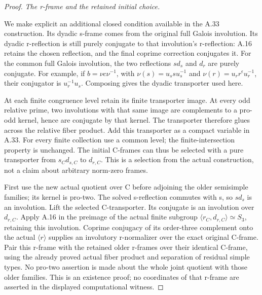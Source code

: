 \begin{proof}
\emph{The r-frame and the retained initial choice.}\par
We make explicit an additional closed condition available in
the A.33 construction. Its dyadic s-frame comes from the original
full Galois involution. Its dyadic r-reflection is still purely
conjugate to that involution's r-reflection: A.16 retains the
chosen reflection, and the final coprime correction conjugates it.
For the common full Galois involution, the two reflections
\(s d_s\) and \(d_r\) are purely conjugate. For example, if
\(b=\nu c\nu^{-1}\), with
\(\nu(s)=u_s s u_s^{-1}\) and
\(\nu(r)=u_r r^{\epsilon}u_r^{-1}\), their conjugator is
\(u_r^{-1}u_s\). Composing gives the dyadic transporter used here.

At each finite congruence level retain its finite transporter
image. At every odd relative prime, two involutions with that
same image are complements to a pro-odd kernel, hence are
conjugate by that kernel. The transporter therefore glues across
the relative fiber product. Add this transporter as a compact
variable in A.33. For every finite collection use a common level;
the finite-intersection property is unchanged. The initial
C-frames can thus be selected with a pure transporter from
\(s_Cd_{s,C}\) to \(d_{r,C}\). This is a selection from the
actual construction, not a claim about arbitrary norm-zero frames.

First use the new actual quotient over C before adjoining the
older semisimple families; its kernel is pro-two. The solved
s-reflection commutes with s, so \(s d_s\) is an involution.
Lift the selected C-transporter. Its conjugate is an involution
over \(d_{r,C}\). Apply A.16 in the preimage of the actual
finite subgroup \(\langle r_C,d_{r,C}\rangle\simeq S_3\),
retaining this involution. Coprime conjugacy of its order-three
complement onto the actual \(\langle r\rangle\) supplies an
involutory r-normalizer over the exact original C-frame.
Pair this r-frame with the retained older r-frames over their
identical C-frame, using the already proved actual fiber product
and separation of residual simple types. No pro-two assertion
is made about the whole joint quotient with those older families.
This is an existence proof; no coordinates of that r-frame are
asserted in the displayed computational witness.


\end{proof}
